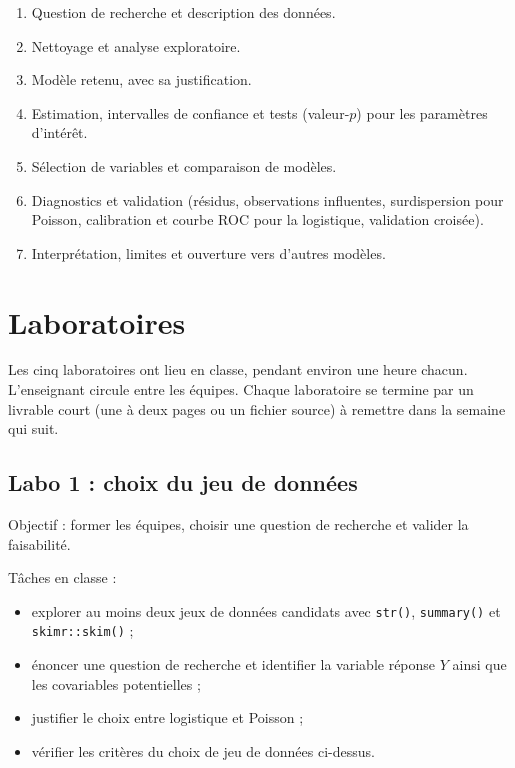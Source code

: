 \documentclass[11pt,letterpaper]{scrartcl}
\begin{document}
\begin{enumerate}
  \item Question de recherche et description des données.
  \item Nettoyage et analyse exploratoire.
  \item Modèle retenu, avec sa justification.
  \item Estimation, intervalles de confiance et tests (valeur-$p$) pour les paramètres d'intérêt.
  \item Sélection de variables et comparaison de modèles.
  \item Diagnostics et validation (résidus, observations influentes, surdispersion pour Poisson, calibration et courbe ROC pour la logistique, validation croisée).
  \item Interprétation, limites et ouverture vers d'autres modèles.
\end{enumerate}

\section{Laboratoires}

Les cinq laboratoires ont lieu en classe, pendant environ une heure chacun. L'enseignant circule entre les équipes. Chaque laboratoire se termine par un livrable court (une à deux pages ou un fichier source) à remettre dans la semaine qui suit.

\subsection{Labo 1 : choix du jeu de données}

Objectif : former les équipes, choisir une question de recherche et valider la faisabilité.

Tâches en classe :
\begin{itemize}
  \item explorer au moins deux jeux de données candidats avec \texttt{str()}, \texttt{summary()} et \texttt{skimr::skim()} ;
  \item énoncer une question de recherche et identifier la variable réponse $Y$ ainsi que les covariables potentielles ;
  \item justifier le choix entre logistique et Poisson ;
  \item vérifier les critères du choix de jeu de données ci-dessus.
\end{itemize}
\end{document}
